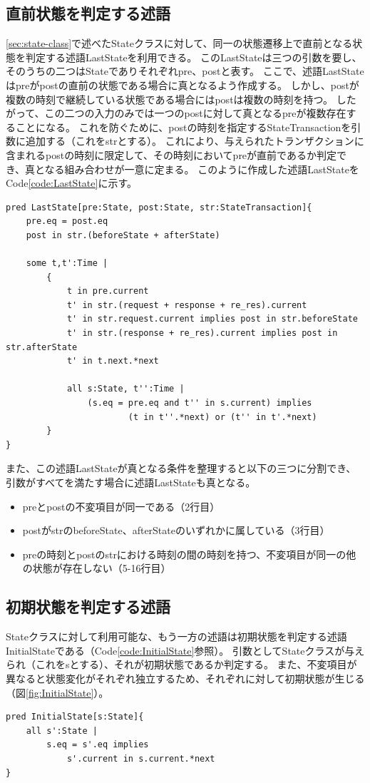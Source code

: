 \documentclass[journal]{IEEEtran}
\begin{document}
\subsection{直前状態を判定する述語}
\ref{sec:state-class}で述べたStateクラスに対して、同一の状態遷移上で直前となる状態を判定する述語LastStateを利用できる。
このLastStateは三つの引数を要し、そのうちの二つはStateでありそれぞれpre、postと表す。
ここで、述語LastStateはpreがpostの直前の状態である場合に真となるよう作成する。
しかし、postが複数の時刻で継続している状態である場合にはpostは複数の時刻を持つ。
したがって、この二つの入力のみでは一つのpostに対して真となるpreが複数存在することになる。
これを防ぐために、postの時刻を指定するStateTransactionを引数に追加する（これをstrとする）。
これにより、与えられたトランザクションに含まれるpostの時刻に限定して、その時刻においてpreが直前であるか判定でき、真となる組み合わせが一意に定まる。
このように作成した述語LastStateをCode\ref{code:LastState}に示す。

\begin{lstlisting}[caption=状態遷移において直前の状態を判定する述語, label=code:LastState]
pred LastState[pre:State, post:State, str:StateTransaction]{
	pre.eq = post.eq
	post in str.(beforeState + afterState)

	some t,t':Time |
		{
			t in pre.current
			t' in str.(request + response + re_res).current
			t' in str.request.current implies post in str.beforeState
			t' in str.(response + re_res).current implies post in str.afterState
			t' in t.next.*next

			all s:State, t'':Time |
				(s.eq = pre.eq and t'' in s.current) implies
						(t in t''.*next) or (t'' in t'.*next)
		}
}
\end{lstlisting}

また、この述語LastStateが真となる条件を整理すると以下の三つに分割でき、引数がすべてを満たす場合に述語LastStateも真となる。
\begin{itemize}
\item preとpostの不変項目が同一である（2行目）
\item postがstrのbeforeState、afterStateのいずれかに属している（3行目）
\item preの時刻とpostのstrにおける時刻の間の時刻を持つ、不変項目が同一の他の状態が存在しない（5-16行目）
\end{itemize}

\subsection{初期状態を判定する述語}
Stateクラスに対して利用可能な、もう一方の述語は初期状態を判定する述語InitialStateである（Code\ref{code:InitialState}参照）。
引数としてStateクラスが与えられ（これをsとする）、それが初期状態であるか判定する。
また、不変項目が異なると状態変化がそれぞれ独立するため、それぞれに対して初期状態が生じる（図\ref{fig:InitialState}）。
\begin{lstlisting}[caption=状態遷移において初期状態を判定する述語, label=code:InitialState]
pred InitialState[s:State]{
	all s':State |
		s.eq = s'.eq implies
			s'.current in s.current.*next
}
\end{lstlisting}

\end{document}
